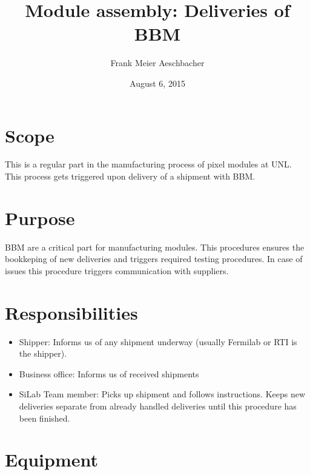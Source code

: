 \documentclass[12pt]{unlsilabsop}
\title{Module assembly: Deliveries of BBM}
\date{August 6, 2015}
\author{Frank Meier Aeschbacher}
\begin{document}
\maketitle

\section{Scope}
This is a regular part in the manufacturing process of pixel modules at UNL. This process gets triggered upon delivery of a shipment with BBM.

\section{Purpose}
BBM are a critical part for manufacturing modules. This procedures ensures the bookkeping of new deliveries and triggers required testing procedures. In case of issues this procedure triggers communication with suppliers.


\section{Responsibilities}

\begin{itemize}
    \item Shipper: Informs us of any shipment underway (usually Fermilab or RTI is the shipper).
    \item Business office: Informs us of received shipments
    \item SiLab Team member: Picks up shipment and follows instructions. Keeps new deliveries separate from already handled deliveries until this procedure has been finished.
\end{itemize}

\section{Equipment}
\end{document}
